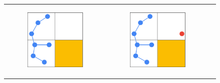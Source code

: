 \begin{figure}[H]
\begin{centering}
\begin{tabular}{ccc}

    \begin{subfigure}{0.3\linewidth}
    \includegraphics[width=\linewidth]{chapters/chapter2/img/keyfunctions/functions1.png}
    \caption{}
    \end{subfigure} & 

    \begin{subfigure}{0.3\linewidth}
    \includegraphics[width=\linewidth]{chapters/chapter2/img/keyfunctions/functions2.png}
    \caption{}
    \end{subfigure} &


\end{tabular}
\end{centering}
\end{figure}
